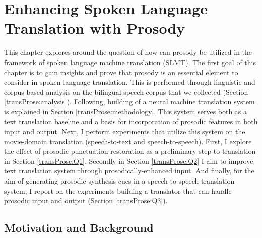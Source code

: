 \chapter{Enhancing Spoken Language Translation with Prosody}
\label{chapter:transProse}
This chapter explores around the question of how can prosody be utilized in the framework of spoken language machine translation (SLMT). The first goal of this chapter is to gain insights and prove that prosody is an essential element to consider in spoken language translation. This is performed through linguistic and corpus-based analysis on the bilingual speech corpus that we collected (Section \ref{transProse:analysis}). Following, building of a neural machine translation system is explained in Section \ref{transProse:methodology}. This system serves both as a text translation baseline and a basis for incorporation of prosodic features in both input and output. Next, I perform experiments that utilize this system on the movie-domain translation (speech-to-text and speech-to-speech). First, I explore the effect of prosodic punctuation restoration as a preliminary step to translation in Section \ref{transProse:Q1}. Secondly in Section \ref{transProse:Q2} I aim to improve text translation system through prosodically-enhanced input. And finally, for the aim of generating prosodic synthesis cues in a speech-to-speech translation system, I report on the experiments building a translator that can handle prosodic input and output (Section \ref{transProse:Q3}). 

\section{Motivation and Background}


